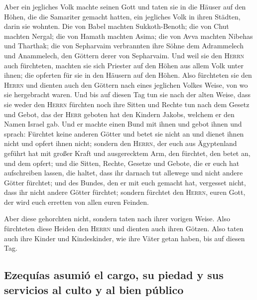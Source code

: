  Aber ein jegliches Volk machte seinen Gott und taten sie
in die Häuser auf den Höhen, die die Samariter gemacht hatten, ein
jegliches Volk in ihren Städten, darin sie wohnten.  Die
von Babel machten Sukkoth-Benoth; die von Chut machten Nergal; die von
Hamath machten Asima;  die von Avva machten Nibehas und
Tharthak; die von Sepharvaim verbrannten ihre Söhne dem Adrammelech und
Anammelech, den Göttern derer von Sepharvaim.  Und weil
sie den \textsc{Herrn} auch fürchteten, machten sie sich Priester auf
den Höhen aus allem Volk unter ihnen; die opferten für sie in den
Häusern auf den Höhen.  Also fürchteten sie den
\textsc{Herrn} und dienten auch den Göttern nach eines jeglichen Volkes
Weise, von wo sie hergebracht waren.  Und bis auf diesen
Tag tun sie nach der alten Weise, dass sie weder den \textsc{Herrn}
fürchten noch ihre Sitten und Rechte tun nach dem Gesetz und Gebot, das
der \textsc{Herr} geboten hat den Kindern Jakobs, welchem er den Namen
Israel gab.  Und er machte einen Bund mit ihnen und gebot
ihnen und sprach: Fürchtet keine anderen Götter und betet sie nicht an
und dienet ihnen nicht und opfert ihnen nicht;  sondern
den \textsc{Herrn}, der euch aus Ägyptenland geführt hat mit großer
Kraft und ausgerecktem Arm, den fürchtet, den betet an, und dem opfert;
 und die Sitten, Rechte, Gesetze und Gebote, die er euch
hat aufschreiben lassen, die haltet, dass ihr darnach tut allewege und
nicht andere Götter fürchtet;  und des Bundes, den er mit
euch gemacht hat, vergesset nicht, dass ihr nicht andere Götter
fürchtet;  sondern fürchtet den \textsc{Herrn}, euren
Gott, der wird euch erretten von allen euren Feinden.

 Aber diese gehorchten nicht, sondern taten nach ihrer
vorigen Weise.  Also fürchteten diese Heiden den
\textsc{Herrn} und dienten auch ihren Götzen. Also taten auch ihre
Kinder und Kindeskinder, wie ihre Väter getan haben, bis auf diesen Tag.

\hypertarget{ezequuxedas-asumiuxf3-el-cargo-su-piedad-y-sus-servicios-al-culto-y-al-bien-puxfablico}{%
\subsection{Ezequías asumió el cargo, su piedad y sus servicios al culto
y al bien
público}\label{ezequuxedas-asumiuxf3-el-cargo-su-piedad-y-sus-servicios-al-culto-y-al-bien-puxfablico}}


